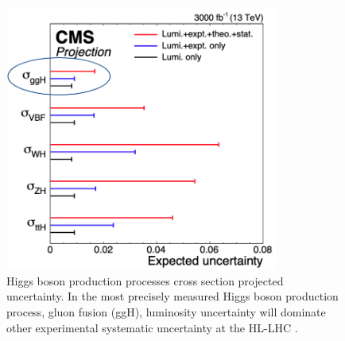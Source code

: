 
\begin{figure}[!htp]
\centering
\includegraphics[width=0.8\textwidth]{ashish_thesis/lumi_precision.png}
\caption[Phase II Uncertainty Projection]{ %
   Higgs boson production processes cross section projected uncertainty. In the most precisely measured Higgs boson production process, gluon fusion (ggH), luminosity uncertainty will dominate other experimental systematic uncertainty at the HL-LHC \cite{Dainese:2703572}.
}
\label{fig:lum_unc}
\end{figure}

